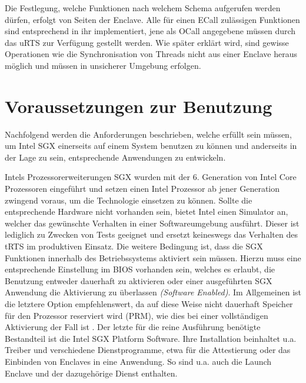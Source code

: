 Die Festlegung, welche Funktionen nach welchem Schema aufgerufen werden dürfen, erfolgt von Seiten der Enclave. Alle für einen \ac{ECall} zulässigen Funktionen sind entsprechend in ihr implementiert, jene als \ac{OCall} angegebene müssen durch das \ac{uRTS} zur Verfügung gestellt werden. Wie später erklärt wird, sind gewisse Operationen wie die Synchronisation von Threads nicht aus einer Enclave heraus möglich und müssen in unsicherer Umgebung erfolgen.

\section{Voraussetzungen zur Benutzung}

Nachfolgend werden die Anforderungen beschrieben, welche erfüllt sein müssen, um Intel \ac{SGX} einerseits auf einem System benutzen zu können und anderseits in der Lage zu sein, entsprechende Anwendungen zu entwickeln.

Intels Prozessorerweiterungen \ac{SGX} wurden mit der 6. Generation von Intel Core Prozessoren eingeführt und setzen einen Intel Prozessor ab jener Generation zwingend voraus, um die Technologie einsetzen zu können. Sollte die entsprechende Hardware nicht vorhanden sein, bietet Intel einen Simulator an, welcher das gewünschte Verhalten in einer Softwareumgebung ausführt. Dieser ist lediglich zu Zwecken von Tests geeignet und ersetzt keineswegs das Verhalten des \ac{tRTS} im produktiven Einsatz. Die weitere Bedingung ist, dass die \ac{SGX} Funktionen innerhalb des Betriebssystems aktiviert sein müssen. Hierzu muss eine entsprechende Einstellung im \ac{BIOS} vorhanden sein, welches es erlaubt, die Benutzung entweder dauerhaft zu aktivieren oder einer ausgeführten \ac{SGX} Anwendung die Aktivierung zu überlassen \textit{(Software Enabled)}. Im Allgemeinen ist die letztere Option empfehlenswert, da auf diese Weise nicht dauerhaft Speicher für den Prozessor reserviert wird (\ac{PRM}), wie dies bei einer vollständigen Aktivierung der Fall ist \cite{SGXDetection}. Der letzte für die reine Ausführung benötigte Bestandteil ist die Intel \ac{SGX} Platform Software. Ihre Installation beinhaltet u.a. Treiber und verschiedene Dienstprogramme, etwa für die Attestierung oder das Einbinden von Enclaves in eine Anwendung. So sind u.a. auch die Launch Enclave und der dazugehörige Dienst enthalten.

